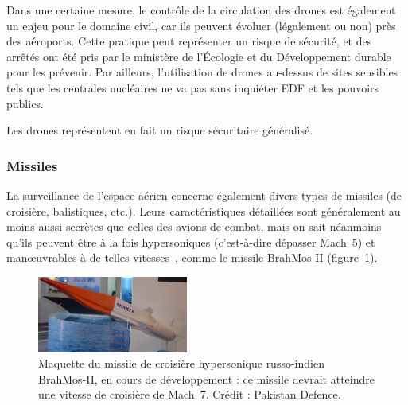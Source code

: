 	
	Dans une certaine mesure, le contrôle de la circulation des drones est également un enjeu pour le domaine civil, car ils peuvent évoluer (légalement ou non) près des aéroports. Cette pratique peut représenter un risque de sécurité, et des arrêtés ont été pris par le ministère de l'Écologie et du Développement durable pour les prévenir\footnotemark. Par ailleurs, l'utilisation de drones au-dessus de sites sensibles tels que les centrales nucléaires ne va pas sans inquiéter EDF et les pouvoirs publics\footnotemark.
	
	\addtocounter{footnote}{-1}
	
	\addtocounter{footnote}{1}

	Les drones représentent en fait un risque sécuritaire généralisé\footnotemark.	
	
	
	\subsubsection{Missiles}	
	La surveillance de l'espace aérien concerne également divers types de missiles (de croisière, balistiques, etc.). Leurs caractéristiques détaillées sont généralement au moins aussi secrètes que celles des avions de combat, mais on sait néanmoins qu'ils peuvent être à la fois hypersoniques (c'est-à-dire dépasser Mach~5) et manœuvrables à de telles vitesses~\cite{missiles}, comme le missile BrahMos-II (figure~\ref{fig:brahmos}).
	
	\begin{figure}%
		\centering
		\includegraphics[width=0.44\textwidth]{figures/ch1/brahmos-II}
		\caption[Missile hypersonique BrahMos-II]{Maquette du missile de croisière hypersonique russo-indien BrahMos-II, en cours de développement : ce missile devrait atteindre une vitesse de croisière de Mach~7\footnotemark{}. Crédit : Pakistan Defence.}
		\label{fig:brahmos}
	\end{figure}
	
